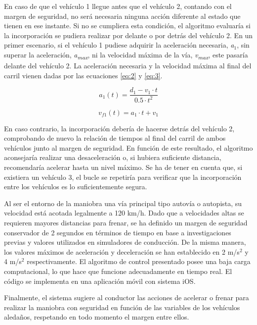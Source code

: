  En caso de que el vehículo 1 llegue antes que el vehículo 2, contando con el margen de seguridad, no será necesaria ninguna acción diferente al estado que tienen en ese instante. Si no se cumpliera esta condición, el algoritmo evaluaría si la incorporación se pudiera realizar por delante o por detrás del vehículo 2. En un primer escenario, si el vehículo 1 pudiese adquirir la aceleración necesaria, \emph{a$_1$}, sin superar la aceleración, \emph{a\textsubscript{max}}, ni la velocidad máxima de la vía, \emph{v\textsubscript{max}}, este pasaría delante del vehículo 2. La aceleración necesaria y la velocidad máxima al final del carril vienen dadas por las ecuaciones \ref{eq:2} y \ref{eq:3}.

 \begin{equation}\label{eq:2}
     a_1(t) = \dfrac{d_1-v_1\cdot t}{0.5\cdot t^2}
 \end{equation}

  \begin{equation}\label{eq:3}
      v_{f1}(t) = a_1 \cdot t + v_1
 \end{equation}

En caso contrario, la incorporación debería de hacerse detrás del vehículo 2, comprobando de nuevo la relación de tiempos al final del carril de ambos vehículos junto al margen de seguridad. En función de este resultado, el algoritmo aconsejaría realizar una desaceleración o, si hubiera suficiente distancia, recomendaría acelerar hasta un nivel máximo. Se ha de tener en cuenta que, si existiera un vehículo 3, el bucle se repetiría para verificar que la incorporación entre los vehículos es lo suficientemente segura. 

Al ser el entorno de la maniobra una vía principal tipo autovía o autopista, su velocidad está acotada legalmente a 120 km/h. Dado que a velocidades altas se requieren mayores distancias para frenar, se ha definido un margen de seguridad conservador de 2 segundos en términos de tiempo en base a investigaciones previas y valores utilizados en simuladores de conducción.  De la misma manera, los valores máximos de aceleración y deceleración se han establecido en 2 m/s$^2$ y 4 m/s$^2$ respectivamente. El algoritmo de control presentado posee una baja carga computacional, lo que hace que funcione adecuadamente en tiempo real. El código se implementa en una aplicación móvil con sistema iOS. 

Finalmente, el sistema sugiere al conductor las acciones de acelerar o frenar para realizar la maniobra con seguridad en función de las variables de los vehículos aledaños, respetando en todo momento el margen entre ellos. 


